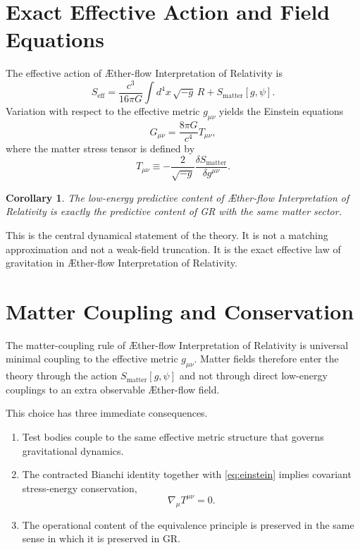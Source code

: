 \documentclass[11pt]{article}
\newcommand{\Aflow}{\AE{}ther-flow}
\newcommand{\TheoryName}{\Aflow{} Interpretation of Relativity}
\newtheorem{corollary}{Corollary}
\begin{document}
\section{Exact Effective Action and Field Equations}

The effective action of \TheoryName{} is
\begin{equation}
S_{\mathrm{eff}}
=
\frac{c^3}{16\pi G}\int d^4x\,\sqrt{-g}\,R
+
S_{\mathrm{matter}}[g,\psi].
\label{eq:SA}
\end{equation}
Variation with respect to the effective metric \(g_{\mu\nu}\) yields the Einstein equations
\begin{equation}
G_{\mu\nu}=\frac{8\pi G}{c^4}T_{\mu\nu},
\label{eq:einstein}
\end{equation}
where the matter stress tensor is defined by
\begin{equation}
T_{\mu\nu}
\equiv
-\frac{2}{\sqrt{-g}}
\frac{\delta S_{\mathrm{matter}}}{\delta g^{\mu\nu}}.
\label{eq:stress}
\end{equation}

\begin{corollary}
The low-energy predictive content of \TheoryName{} is exactly the predictive content of GR with the same matter sector.
\end{corollary}

This is the central dynamical statement of the theory. It is not a matching approximation and not a weak-field truncation. It is the exact effective law of gravitation in \TheoryName{}.

\section{Matter Coupling and Conservation}

The matter-coupling rule of \TheoryName{} is universal minimal coupling to the effective metric \(g_{\mu\nu}\). Matter fields therefore enter the theory through the action \(S_{\mathrm{matter}}[g,\psi]\) and not through direct low-energy couplings to an extra observable \Aflow{} field.

This choice has three immediate consequences.
\begin{enumerate}
    \item Test bodies couple to the same effective metric structure that governs gravitational dynamics.
    \item The contracted Bianchi identity together with \eqref{eq:einstein} implies covariant stress-energy conservation,
    \begin{equation}
    \nabla_{\mu}T^{\mu\nu}=0.
    \label{eq:conservation}
    \end{equation}
    \item The operational content of the equivalence principle is preserved in the same sense in which it is preserved in GR.
\end{enumerate}
\end{document}

